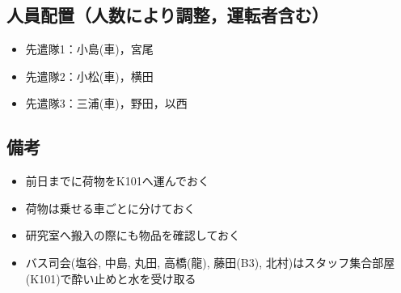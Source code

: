 \subsection{人員配置（人数により調整，運転者含む）}
\begin{itemize}
\item 先遣隊1：小島(車)，宮尾
\item 先遣隊2：小松(車)，横田
\item 先遣隊3：三浦(車)，野田，以西

\end{itemize}

\subsection{備考}
\begin{itemize}
\item 前日までに荷物をK101へ運んでおく
\item 荷物は乗せる車ごとに分けておく
\item 研究室へ搬入の際にも物品を確認しておく
\item バス司会(塩谷, 中島, 丸田, 高橋(龍), 藤田(B3), 北村)はスタッフ集合部屋(K101)で酔い止めと水を受け取る
\end{itemize}


%
